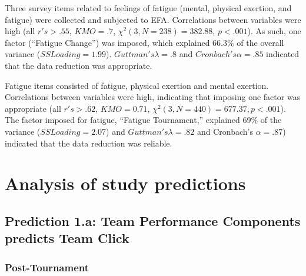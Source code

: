 \begin{CJK}{UTF8}{gbsn}
Three survey items related to feelings of fatigue (mental, physical exertion, and fatigue)  were collected and subjected to EFA.
Correlations between variables were high (all $r's > .55$, $KMO = .7$, $\chi^2(3, N = 238) = 382.88$, $p < .001$).  As such, one factor (``Fatigue Change'') was imposed, which explained 66.3\% of the overall variance ($SS Loading = 1.99$).  $Guttman's \lambda =.8$ and $Cronbach's \alpha = .85$ indicated that the data reduction was appropriate.

Fatigue items consisted of fatigue, physical exertion and mental exertion. Correlations between variables were high, indicating that imposing one factor was appropriate (all $r's > .62$, $KMO = 0.71$, $\chi^2(3, N = 440) =  677.37, p < .001$).  The factor imposed for fatigue, ``Fatigue Tournament,'' explained 69\% of the variance ($SS Loading = 2.07$) and $Guttman's \lambda =.82$ and Cronbach's $\alpha = .87$) indicated that the data reduction was reliable.






























 \section{Analysis of study predictions\label{app8:analysisPredictions}}



 \subsection{Prediction 1.a: Team Performance Components predicts Team Click\label{app8:prediction1}}



 \subsubsection{Post-Tournament\label{app8:prediction1Post}}


\end{CJK}

